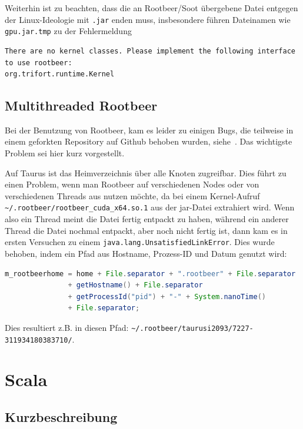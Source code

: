 \documentclass[german,bibnum,beleg,zihtitle,german,hyperref,utf8]{zihpub}
\begin{document}
Weiterhin ist zu beachten, dass die an Rootbeer/Soot übergebene Datei entgegen der Linux-Ideologie mit \texttt{.jar} enden muss, insbesondere führen Dateinamen wie \texttt{gpu.jar.tmp} zu der Fehlermeldung 
\begin{lstlisting}
There are no kernel classes. Please implement the following interface to use rootbeer:
org.trifort.runtime.Kernel
\end{lstlisting}


\section{Multithreaded Rootbeer}

Bei der Benutzung von Rootbeer, kam es leider zu einigen Bugs, die teilweise in einem geforkten Repository auf Github behoben wurden, siehe~\cite{ownrootbeerfork}.
Das wichtigste Problem sei hier kurz vorgestellt.

Auf Taurus ist das Heimverzeichnis über alle Knoten zugreifbar. Dies führt zu einen Problem, wenn man Rootbeer auf verschiedenen Nodes oder von verschiedenen Threads aus nutzen möchte, da bei einem Kernel-Aufruf \lstinline!~/.rootbeer/rootbeer_cuda_x64.so.1! aus der jar-Datei extrahiert wird. Wenn also ein Thread meint die Datei fertig entpackt zu haben, während ein anderer Thread die Datei nochmal entpackt, aber noch nicht fertig ist, dann kam es in ersten Versuchen zu einem \texttt{java.lang.UnsatisfiedLinkError}. Dies wurde behoben, indem ein Pfad aus Hostname, Prozess-ID und Datum genutzt wird:
\begin{lstlisting}[language=Java]
m_rootbeerhome = home + File.separator + ".rootbeer" + File.separator
               + getHostname() + File.separator
               + getProcessId("pid") + "-" + System.nanoTime()
               + File.separator;
\end{lstlisting}\vspace{-1.5\baselineskip}
Dies resultiert z.B. in diesen Pfad: \lstinline!~/.rootbeer/taurusi2093/7227-311934180383710/!.


\chapter{Scala}
\label{sct:scala}

\section{Kurzbeschreibung}
\end{document}
